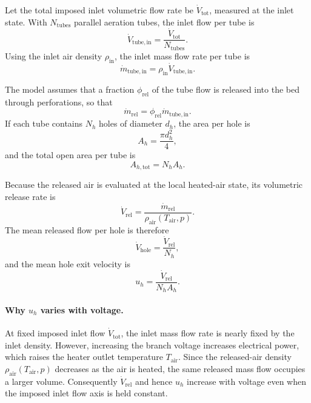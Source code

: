 \documentclass{article}
\begin{document}
Let the total imposed inlet volumetric flow rate be $\dot{V}_{\mathrm{tot}}$,
measured at the inlet state. With $N_{\mathrm{tubes}}$ parallel aeration
tubes, the inlet flow per tube is
\begin{equation}
\dot{V}_{\mathrm{tube,in}} = \frac{\dot{V}_{\mathrm{tot}}}{N_{\mathrm{tubes}}}.
\end{equation}
Using the inlet air density $\rho_{\mathrm{in}}$, the inlet mass flow rate per
tube is
\begin{equation}
\dot{m}_{\mathrm{tube,in}} = \rho_{\mathrm{in}} \dot{V}_{\mathrm{tube,in}}.
\end{equation}

The model assumes that a fraction $\phi_{\mathrm{rel}}$ of the tube flow is
released into the bed through perforations, so that
\begin{equation}
\dot{m}_{\mathrm{rel}} = \phi_{\mathrm{rel}} \dot{m}_{\mathrm{tube,in}}.
\end{equation}
If each tube contains $N_h$ holes of diameter $d_h$, the area per hole is
\begin{equation}
A_h = \frac{\pi d_h^2}{4},
\end{equation}
and the total open area per tube is
\begin{equation}
A_{h,\mathrm{tot}} = N_h A_h.
\end{equation}

Because the released air is evaluated at the local heated-air state,
its volumetric release rate is
\begin{equation}
\dot{V}_{\mathrm{rel}} = \frac{\dot{m}_{\mathrm{rel}}}{\rho_{\mathrm{air}}(T_{\mathrm{air}},p)}.
\end{equation}
The mean released flow per hole is therefore
\begin{equation}
\dot{V}_{\mathrm{hole}} = \frac{\dot{V}_{\mathrm{rel}}}{N_h},
\end{equation}
and the mean hole exit velocity is
\begin{equation}
u_h = \frac{\dot{V}_{\mathrm{rel}}}{N_h A_h}.
\end{equation}

\paragraph*{Why $u_h$ varies with voltage.}
At fixed imposed inlet flow $\dot{V}_{\mathrm{tot}}$, the inlet mass flow rate
is nearly fixed by the inlet density. However, increasing the branch voltage
increases electrical power, which raises the heater outlet temperature
$T_{\mathrm{air}}$. Since the released-air density
$\rho_{\mathrm{air}}(T_{\mathrm{air}},p)$ decreases as the air is heated,
the same released mass flow occupies a larger volume. Consequently
$\dot{V}_{\mathrm{rel}}$ and hence $u_h$ increase with voltage even when the
imposed inlet flow axis is held constant.
\end{document}
